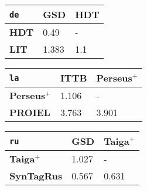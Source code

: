     \begin{minipage}{0.45\textwidth}
    \begin{table}[H]
    \begin{tabular}{|l|l|l|}
    \hline
    \texttt{de} & \cellcolor{gray!25}\textbf{GSD} & \cellcolor{gray!25}\textbf{HDT} \\
    \hline
    \cellcolor{gray!25}\textbf{HDT} & \cellcolor{green!25}0.49 & - \\
    \hline
    \textbf{LIT} & \cellcolor{gray!25}1.383 & \cellcolor{gray!25}1.1 \\
    \hline
    \end{tabular}
    \end{table}
    
    \begin{table}[H]
    \begin{tabular}{|l|l|l|}
    \hline
    \texttt{la} & \textbf{ITTB} & \textbf{Perseus}$^{+}$ \\
    \hline
    \textbf{Perseus}$^{+}$ & \cellcolor{green!25}1.106 & - \\
    \hline
    \textbf{PROIEL} & \cellcolor{red!25}3.763 & \cellcolor{green!25}3.901 \\
    \hline
    \end{tabular}
    \end{table}
    
    \begin{table}[H]
    \end{table}
    
    \begin{table}[H]
    \begin{tabular}{|l|l|l|}
    \hline
    \texttt{ru} & \cellcolor{gray!25}\textbf{GSD} & \textbf{Taiga}$^{+}$ \\
    \hline
    \textbf{Taiga$^{+}$} & \cellcolor{green!25}1.027 & - \\
    \hline
    \textbf{SynTagRus} & \cellcolor{gray!25}0.567 & \cellcolor{green!25}0.631 \\
    \hline
    \end{tabular}
    \end{table}
    \end{minipage}
    
